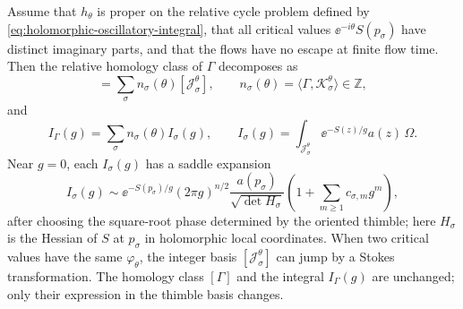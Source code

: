 \begin{theorem}
\label{thm:finite-dimensional-thimble-decomposition}
Assume that \(h_\theta\) is proper on the relative cycle problem defined by
\eqref{eq:holomorphic-oscillatory-integral}, that all critical values
\(\ee^{-i\theta}S(p_\sigma)\) have distinct imaginary parts, and that the
flows have no escape at finite flow time.  Then the relative homology class of
\(\Gamma\) decomposes as
\begin{equation}
  [\Gamma]
  =
  \sum_\sigma n_\sigma(\theta)
  [\mathcal J_\sigma^\theta],
  \qquad
  n_\sigma(\theta)=\langle \Gamma,\mathcal K_\sigma^\theta\rangle\in\mathbb Z,
  \label{eq:thimble-homology-decomposition}
\end{equation}
and
\begin{equation}
  I_\Gamma(g)
  =
  \sum_\sigma n_\sigma(\theta)
  I_\sigma(g),
  \qquad
  I_\sigma(g)=
  \int_{\mathcal J_\sigma^\theta}
  \ee^{-S(z)/g}a(z)\,\Omega .
  \label{eq:thimble-integral-decomposition}
\end{equation}
Near \(g=0\), each \(I_\sigma(g)\) has a saddle expansion
\begin{equation}
  I_\sigma(g)
  \sim
  \ee^{-S(p_\sigma)/g}
  (2\pi g)^{n/2}
  \frac{a(p_\sigma)}
       {\sqrt{\det H_\sigma}}
  \left(1+\sum_{m\ge1}c_{\sigma,m}g^m\right),
  \label{eq:thimble-saddle-expansion}
\end{equation}
after choosing the square-root phase determined by the oriented thimble; here
\(H_\sigma\) is the Hessian of \(S\) at \(p_\sigma\) in holomorphic local
coordinates.  When two critical values have the same
\(\varphi_\theta\), the integer basis
\([\mathcal J_\sigma^\theta]\) can jump by a Stokes transformation.  The
homology class \([\Gamma]\) and the integral \(I_\Gamma(g)\) are unchanged;
only their expression in the thimble basis changes.
\end{theorem}

